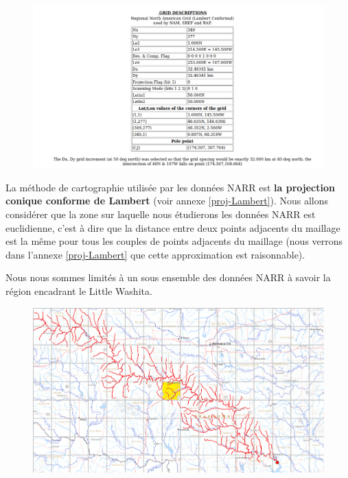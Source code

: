 \documentclass[a4paper,11pt]{article}
\numberwithin{equation}{section}
\begin{document}
\begin{figure}[H]
	\begin{center}
		\includegraphics[scale=0.4]{grid_prop.png}
	\end{center}
	\label{fig-maillage NARR}
\end{figure}

La méthode de cartographie utilisée par les données NARR est \textbf{la projection conique conforme de Lambert} (voir annexe \ref{proj-Lambert}). Nous allons considérer que la zone sur laquelle nous étudierons les données NARR est euclidienne, c'est à dire que la distance entre deux points adjacents du maillage est la même pour tous les couples de points adjacents du maillage (nous verrons dans l'annexe \ref{proj-Lambert} que cette approximation est raisonnable).

\vspace{0.7 cm}

Nous nous sommes limités à un sous ensemble des données NARR à savoir la région encadrant le Little Washita.
 

\begin{figure}[H]
	\begin{center}
		\includegraphics[scale=0.3]{Little_Washita.png}
	\end{center}
	\label{fig-Little-Washita_maillage}
\end{figure}
\end{document}
